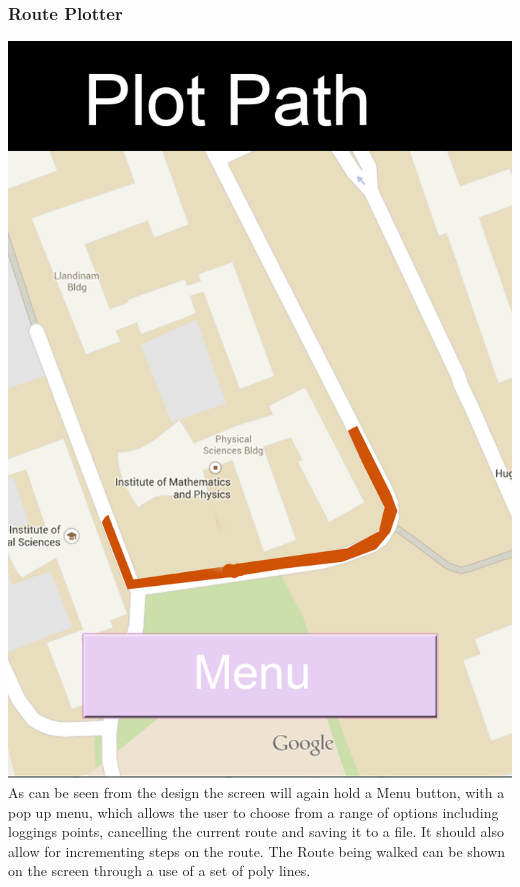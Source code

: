 \documentclass[10pt,a4paper]{article}
\begin{document}
\subsubsection{Route Plotter}
\includegraphics[scale=0.6]{Plot.png}\\
As can be seen from the design the screen will again hold a Menu button, with a pop up menu, which allows the user to choose from a range of options including loggings points, cancelling the current route and saving it to a file. It should also allow for incrementing steps on the route. The Route being walked can be shown on the screen through a use of a set of poly lines.
\end{document}
